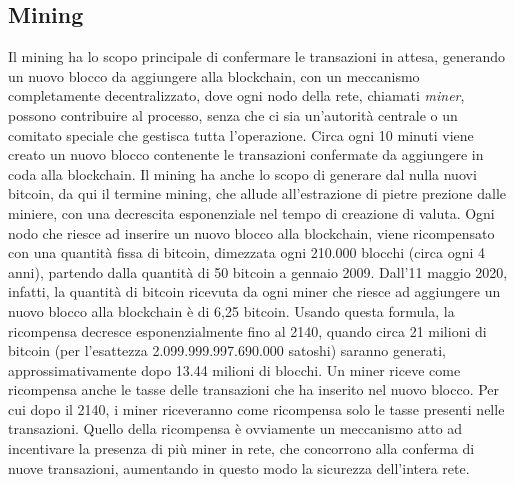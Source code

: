 \subsection{Mining}
Il mining ha lo scopo principale di confermare le transazioni in attesa, generando un nuovo blocco da aggiungere alla blockchain, con un meccanismo completamente decentralizzato, dove ogni nodo della rete, chiamati \emph{miner}, possono contribuire al processo, senza che ci sia un'autorità centrale o un comitato speciale che gestisca tutta l'operazione.  Circa ogni 10 minuti viene creato un nuovo blocco contenente le transazioni confermate da aggiungere in coda alla blockchain.
Il mining ha anche lo scopo di generare dal nulla nuovi bitcoin, da qui il termine mining, che allude all'estrazione di pietre prezione dalle miniere, con una decrescita esponenziale nel tempo di creazione di valuta. Ogni nodo che riesce ad inserire un nuovo blocco alla blockchain, viene ricompensato con una quantità fissa di bitcoin, dimezzata ogni 210.000 blocchi (circa ogni 4 anni), partendo dalla quantità di 50 bitcoin a gennaio 2009. Dall'11 maggio 2020, infatti, la quantità di bitcoin ricevuta da ogni miner che riesce ad aggiungere un nuovo blocco alla blockchain è di 6,25 bitcoin. Usando questa formula, la ricompensa decresce esponenzialmente fino al 2140, quando circa 21 milioni di bitcoin (per l'esattezza 2.099.999.997.690.000 satoshi) saranno generati, approssimativamente dopo 13.44 milioni di blocchi. Un miner riceve come ricompensa anche le tasse delle transazioni che ha inserito nel nuovo blocco. Per cui dopo il 2140, i miner riceveranno come ricompensa solo le tasse presenti nelle transazioni. Quello della ricompensa è ovviamente un meccanismo atto ad incentivare la presenza di più miner in rete, che concorrono alla conferma di nuove transazioni, aumentando in questo modo la sicurezza dell'intera rete.

